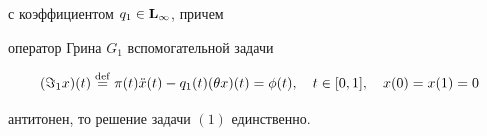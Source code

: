 \begin{thm}
с коэффициентом $q_1\in\bold L_\infty$, причем


оператор Грина $G_1$ вспомогательной задачи


\begin{equation}


({\Im}_1x)(t)


\overset{\mathrm{def}}{=}{}


\pi (t)\Ddot{x}(t)-q_1(t)(\theta x)(t)=\phi(t),\quad


t\in[0,1],\quad x(0)=x(1)=0


\end{equation}


антитонен, то решение задачи $(1)$ единственно.


\end{thm}





